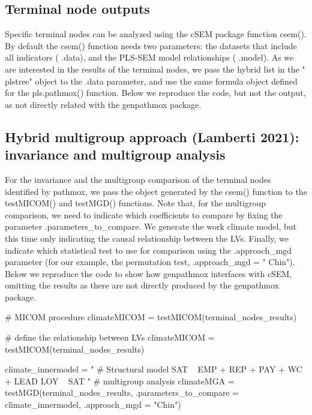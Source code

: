 \hypertarget{terminal-node-outputs}{%
\subsection{Terminal node outputs}\label{terminal-node-outputs}}

Specific terminal nodes can be analyzed using the cSEM package function
csem(). By default the csem() function needs two parameters: the
datasets that include all indicators ( .data), and the PLS-SEM model
relationships ( .model). As we are interested in the results of the
terminal nodes, we pass the hybrid list in the " plstree" object to
the .data parameter, and use the same formula object defined for the
pls.pathmox() function. Below we reproduce the code, but not the output,
as not directly related with the genpathmox package.

\hypertarget{hybrid-multigroup-approach-lamberti21-invariance-and-multigroup-analysis}{%
\subsection{Hybrid multigroup approach (Lamberti 2021): invariance and multigroup analysis}\label{hybrid-multigroup-approach-lamberti21-invariance-and-multigroup-analysis}}

For the invariance and the multigroup comparison of the terminal nodes
identified by pathmox, we pass the object generated by the csem()
function to the testMICOM() and testMGD() functions. Note that, for the
multigroup comparison, we need to indicate which coefficients to compare
by fixing the parameter .parameters\_to\_compare. We generate the work
climate model, but this time only indicating the causal relationship
between the LVs. Finally, we indicate which statistical test to use for
comparison using the .approach\_mgd parameter (for our example, the
permutation test, .approach\_mgd = " Chin"). Below we reproduce the
code to show how genpathmox interfaces with cSEM, omitting the results
as there are not directly produced by the genpathmox package.

\begin{example}
\# MICOM procedure climateMICOM = testMICOM(terminal\_nodes\_results)

\# define the relationship between LVs climateMICOM =
testMICOM(terminal\_nodes\_results)

climate\_innermodel = " \# Structural model SAT ~ EMP + REP + PAY + WC +
LEAD LOY ~ SAT " \# multigroup analysis climateMGA =
testMGD(terminal\_nodes\_results, .parameters\_to\_compare =
climate\_innermodel, .approach\_mgd = "Chin")
\end{example}

